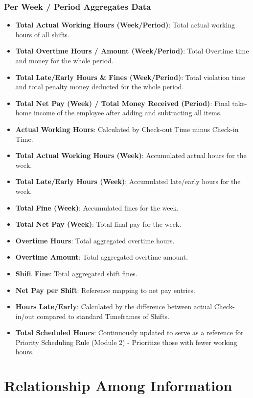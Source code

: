 \subsubsection{Per Week / Period Aggregates Data}
\begin{itemize}
    \item \textbf{Total Actual Working Hours (Week/Period)}: Total actual working hours of all shifts.
    \item \textbf{Total Overtime Hours / Amount (Week/Period)}: Total Overtime time and money for the whole period.
    \item \textbf{Total Late/Early Hours \& Fines (Week/Period)}: Total violation time and total penalty money deducted for the whole period.
    \item \textbf{Total Net Pay (Week) / Total Money Received (Period)}: Final take-home income of the employee after adding and subtracting all items.
    \item \textbf{Actual Working Hours}: Calculated by Check-out Time minus Check-in Time.
    \item \textbf{Total Actual Working Hours (Week)}: Accumulated actual hours for the week.
    \item \textbf{Total Late/Early Hours (Week)}: Accumulated late/early hours for the week.
    \item \textbf{Total Fine (Week)}: Accumulated fines for the week.
    \item \textbf{Total Net Pay (Week)}: Total final pay for the week.
    \item \textbf{Overtime Hours}: Total aggregated overtime hours.
    \item \textbf{Overtime Amount}: Total aggregated overtime amount.
    \item \textbf{Shift Fine}: Total aggregated shift fines.
    \item \textbf{Net Pay per Shift}: Reference mapping to net pay entries.
    \item \textbf{Hours Late/Early}: Calculated by the difference between actual Check-in/out compared to standard Timeframes of Shifts.
    \item \textbf{Total Scheduled Hours}: Continuously updated to serve as a reference for Priority Scheduling Rule (Module 2) - Prioritize those with fewer working hours.
\end{itemize}


\section{Relationship Among Information}


